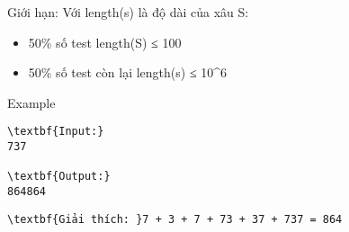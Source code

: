 Giới hạn:
Với length(s) là độ dài của xâu S:
\begin{itemize}
	\item 50\% số test length(S) ≤ 100
	\item 50\% số test còn lại length(s) ≤ 10^6
\end{itemize}
Example
\begin{verbatim}
\textbf{Input:}
737

\textbf{Output:}
864864
\end{verbatim}
\begin{verbatim}
\textbf{Giải thích: }7 + 3 + 7 + 73 + 37 + 737 = 864
\end{verbatim}